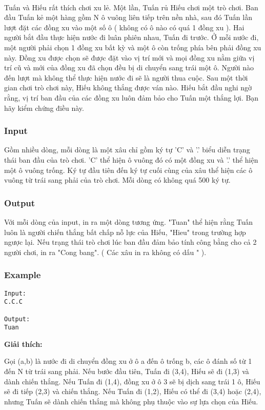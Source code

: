 

 

Tuấn và Hiếu rất thích chơi xu lẻ. Một lần, Tuấn rủ Hiếu chơi một trò chơi. Ban đầu Tuấn kẻ một hàng gồm N ô vuông liên tiếp trên nền nhà, sau đó Tuấn lần lượt đặt các đồng xu vào một số ô ( không có ô nào có quá 1 đồng xu ). Hai người bắt đầu thực hiện nước đi luân phiên nhau, Tuấn đi trước. Ở mỗi nước đi, một người phải chọn 1 đồng xu bất kỳ và một ô còn trống phía bên phải đồng xu này. Đồng xu được chọn sẽ được đặt vào vị trí mới và mọi đồng xu nằm giữa vị trí cũ và mới của đồng xu đã chọn đều bị di chuyển sang trái một ô. Người nào đến lượt mà không thể thực hiện nước đi sẽ là người thua cuộc. Sau một thời gian chơi trò chơi này, Hiếu không thắng được ván nào. Hiếu bắt đầu nghi ngờ rằng, vị trí ban đầu của các đồng xu luôn đảm bảo cho Tuấn một thắng lợi. Bạn hãy kiểm chứng điều này.

\subsubsection{Input}

Gồm nhiều dòng, mỗi dòng là một xâu chỉ gồm ký tự 'C' và '.' biểu diễn trạng thái ban đầu của trò chơi. 'C' thể hiện ô vuông đó có một đồng xu và '.' thể hiện một ô vuông trống. Ký tự đầu tiên đến ký tự cuối cùng của xâu thể hiện các ô vuông từ trái sang phải của trò chơi. Mỗi dòng có không quá 500 ký tự.

\subsubsection{Output}

Với mỗi dòng của input, in ra một dòng tương ứng. "Tuan" thể hiện rằng Tuấn luôn là người chiến thắng bất chấp nỗ lực của Hiếu, "Hieu" trong trường hợp ngược lại. Nếu trạng thái trò chơi lúc ban đầu đảm bảo tính công bằng cho cả 2 người chơi, in ra "Cong bang". ( Các xâu in ra không có dấu " ).

\subsubsection{Example}
\begin{verbatim}
Input:
C.C.C

Output:
Tuan

\end{verbatim}

\textbf{Giải thích:}

Gọi (a,b) là nước đi di chuyển đồng xu ở ô a đến ô trống b, các ô đánh số từ 1 đến N từ trái sang phải. Nếu bước đầu tiên, Tuấn đi (3,4), Hiếu sẽ đi (1,3) và dành chiến thắng. Nếu Tuấn đi (1,4), đồng xu ở ô 3 sẽ bị dịch sang trái 1 ô, Hiếu sẽ đi tiếp (2,3) và chiến thắng. Nếu Tuấn đi (1,2), Hiếu có thể đi (3,4) hoặc (2,4), nhưng Tuấn sẽ dành chiến thắng mà không phụ thuộc vào sự lựa chọn của Hiếu.